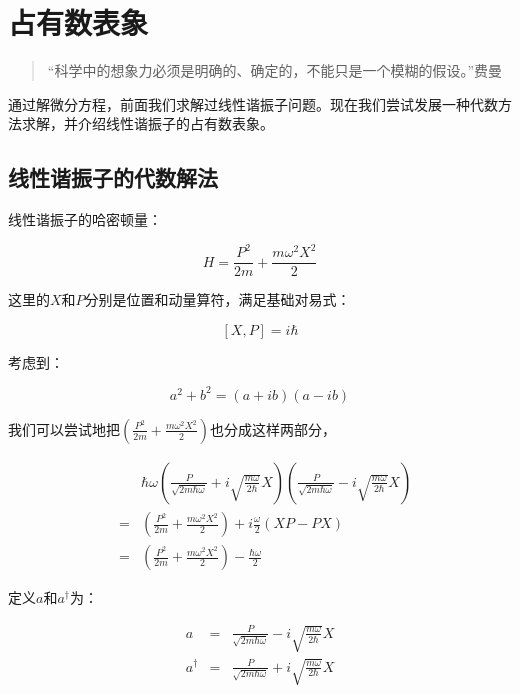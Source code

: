 \section{占有数表象}

\begin{quotation}
``科学中的想象力必须是明确的、确定的，不能只是一个模糊的假设。''\qquad 费曼
\end{quotation}

通过解微分方程，前面我们求解过线性谐振子问题。现在我们尝试发展一种代数方法求解，并介绍线性谐振子的占有数表象。

\subsection{线性谐振子的代数解法}


线性谐振子的哈密顿量：

\begin{equation}
H = \frac{P^2}{2m} + \frac{m \omega^2 X^2}{2}
\end{equation}

这里的$X$和$P$分别是位置和动量算符，满足基础对易式：

\begin{equation}
\left[X, P \right] = i \hbar
\end{equation}

考虑到：

\begin{equation}
a^2 + b^2 = \left( a + ib \right) \left( a - ib \right) 
\end{equation}

我们可以尝试地把$\left( \frac{P^2}{2m} + \frac{m \omega^2 X^2}{2} \right)$也分成这样两部分，

\begin{eqnarray*}
{} & {} & \hbar \omega \left( \frac{P}{\sqrt{ 2m \hbar \omega }}  + i \sqrt{ \frac{m \omega }{2 \hbar} } X  \right) \left( \frac{P}{\sqrt{ 2m \hbar \omega }}  - i \sqrt{ \frac{m \omega }{2 \hbar} } X  \right)\\
{} & = & \left( \frac{P^2}{2m} + \frac{m \omega^2 X^2}{2} \right) + i \frac{\omega}{2} \left( XP - PX \right) \\
{} & = & \left( \frac{P^2}{2m} + \frac{m \omega^2 X^2}{2} \right) - \frac{\hbar \omega}{2}
\end{eqnarray*}

定义$a$和$a^\dagger$为：

\begin{eqnarray}\label{uv_eta_equals_1}
a &=& \frac{P}{\sqrt{ 2m \hbar \omega }} - i \sqrt{ \frac{m \omega }{2 \hbar} } X \\\label{uv_eta_equals11}
a^\dagger &=& \frac{P}{\sqrt{ 2m \hbar \omega }}  + i \sqrt{ \frac{m \omega }{2 \hbar} } X
\end{eqnarray}


